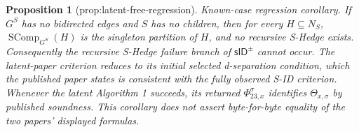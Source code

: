 \documentclass{article}
\newtheorem{proposition}{Proposition}
\begin{document}
\begin{proposition}[prop:latent-free-regression]\label{prop:latent-free-regression}
Known-case regression corollary. If \(G^S\) has no bidirected edges and \(S\) has no children, then for every \(H\subseteq N_S\), \(\operatorname{SComp}_{G^S}(H)\) is the singleton partition of \(H\), and no recursive S-Hedge exists. Consequently the recursive S-Hedge failure branch of \(\mathsf{sID}^{\pm}\) cannot occur. The latent-paper criterion reduces to its initial selected d-separation condition, which the published paper states is consistent with the fully observed S-ID criterion. Whenever the latent Algorithm 1 succeeds, its returned \(\Phi_{23,x}^{\sigma}\) identifies \(\Theta_{x,\sigma}\) by published soundness. This corollary does not assert byte-for-byte equality of the two papers' displayed formulas.
\end{proposition}
\end{document}
